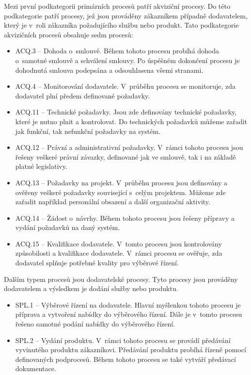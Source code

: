 \documentclass[czech,master]{diploma}
\begin{document}
Mezi první podkategorii primárních procesů patří akviziční procesy. Do této podkategorie patří procesy, jež jsou prováděny zákazníkem případně dodavatelem, který je v~roli zákazníka požadujícího službu nebo produkt. Tato podkategorie akvizičních procesů obsahuje sedm procesů:

\begin{itemize}
\item ACQ.3 -- Dohoda o~smlouvě. Během tohoto procesu probíhá dohoda o~samotné smlouvě a schválení smlouvy. Po úspěšném dokončení procesu je dohodnutá smlouva podepsána a odsouhlasena všemi stranami.
\item ACQ.4 -- Monitorování dodavatele. V~průběhu procesu se monitoruje, zda dodavatel plní předem definované požadavky.
\item ACQ.11 -- Technické požadavky. Jsou zde definovány technické požadavky, které je nutno plnit a kontrolovat. Do technických požadavků můžeme zařadit jak funkční, tak nefunkční požadavky na systém.
\item ACQ.12 -- Právní a administrativní požadavky. V~rámci tohoto procesu jsou řešeny veškeré právní závazky, definované jak ve smlouvě, tak i  na základě platné legislativy.
\item ACQ.13 -- Požadavky na projekt. V~průběhu procesu jsou definovány a ověřeny veškeré požadavky související s~celým projektem. Můžeme zde zařadit například personální obsazení a další organizační aktivity.
\item ACQ.14 -- Žádost o~návrhy.  Během tohoto procesu jsou řešeny přípravy a vydání požadavků na daný systém.
\item ACQ.15 -- Kvalifikace dodavatele. V~tomto procesu jsou kontrolovány způsobilosti a kvalifikace dodavatele. V~rámci procesu se ověřuje, zda dodavatel splňuje potřebné kvality pro výběrové řízení.
\end{itemize}

Dalším typem procesů jsou dodavatelské procesy. Tyto procesy jsou prováděny dodavatelem a výsledkem je dodání služby nebo produktu.

\begin{itemize}
\item SPL.1 -- Výběrové řízení na dodavatele. Hlavní myšlenkou tohoto procesu je příprava a vytvoření nabídky do výběrového řízení.  Dále je v~tomto procesu řešeno samotné podání nabídky do výběrového řízení.
\item SPL.2 -- Vydání produktu. V~rámci tohoto procesu se provádí předávání vyvinutého produktu zákazníkovi. Předávání produktu probíhá řízeně pomocí definovaných podprocesů. Během tohoto procesu se také vytváří předávací dokumentace.
\end{itemize}
\end{document}
